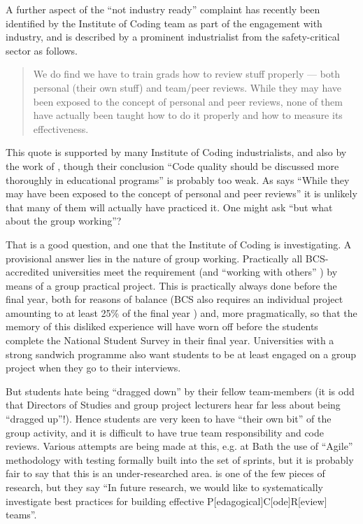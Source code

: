 \documentclass[sigconf,anonymous]{acmart}
\begin{document}
A further aspect of the ``not industry ready'' complaint has recently
been identified by the Institute of Coding team as part of the
engagement with industry, and is described by a prominent
industrialist from the safety-critical sector as follows.
\begin{quote} We do find we have to train grads how to review stuff
properly --- both personal (their own stuff) and team/peer
reviews. While they may have been exposed to the concept of personal
and peer reviews, none of them have actually been taught how to do it
properly and how to measure its effectiveness. \cite{Chapman2018c}
\end{quote} This quote is supported by many Institute of Coding
industrialists, and also by the work of \cite{Boerstleretal2018a},
though their conclusion ``Code quality should be discussed more
thoroughly in educational programs'' is probably too weak. As
\cite{Chapman2018c} says ``While they may have been exposed to the
concept of personal and peer reviews'' it is unlikely that many of
them will actually have practiced it.  One might ask ``but what about
the group working''?
\par That is a good question, and one that the Institute of Coding is
investigating. A provisional answer lies in the nature of group
working. Practically all BCS-accredited universities meet the
requirement \cite[Requirement 2.3.1]{BCS2018a} (and ``working with
others'' \cite[Requirement 2.3.2]{BCS2018a}) by means of a group
practical project. This is practically always done before the final
year, both for reasons of balance (BCS also requires an individual
project amounting to at least 25\% of the final year \cite[Requirement
2.5.1]{BCS2018a}) and, more pragmatically, so that the memory of this
disliked experience will have worn off before the students complete
the National Student Survey in their final year. Universities with a
strong sandwich programme also want students to be at least engaged on
a group project when they go to their interviews.

But students hate being ``dragged down'' by their fellow team-members
(it is odd that Directors of Studies and group project lecturers hear
far less about being ``dragged up''!).  Hence students are very keen
to have ``their own bit'' of the group activity, and it is difficult
to have true team responsibility and code reviews.  Various attempts
are being made at this, e.g. at Bath the use of ``Agile'' methodology
with testing formally built into the set of sprints, but it is
probably fair to say that this is an under-researched area.
\cite{Hundhausenetal2013a} is one of the few pieces of research, but
they say ``In future research, we would like to systematically
investigate best practices for building effective
P[edagogical]C[ode]R[eview] teams''.
\end{document}
